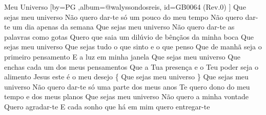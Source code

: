 \beginsong
{Meu Universo %
}[by={PG %
},album={@walyssondosreis},
id={GB0064 %
(Rev.0) %
}]
\beginverse*
Que sejas meu universo
Não quero dar-te só um pouco do meu tempo
Não quero dar-te um dia apenas da semana
\endverse
\beginverse*
Que sejas meu universo
Não quero dar-te as palavras como gotas
Quero que saia um dilúvio de bênçãos da minha boca
\endverse
\beginchorus
Que sejas meu universo
Que sejas tudo o que sinto e o que penso
Que de manhã seja o primeiro pensamento
E a luz em minha janela
Que sejas meu universo
Que enchas cada um dos meus pensamentos
Que a Tua presença e o Teu poder seja o alimento
Jesus este é o meu desejo
\{ Que sejas meu universo \}
\endchorus
\beginverse*
Que sejas meu universo
Não quero dar-te só uma parte dos meus anos
Te quero dono do meu tempo e dos meus planos
\endverse
\beginverse*
Que sejas meu universo
Não quero a minha vontade
Quero agradar-te
E cada sonho que há em mim quero entregar-te
\endverse
\begin{comment}
\lstset{basicstyle=\scriptsize\bf} %
\tab{Solo 1}
\begin{lstlisting}
E|-----------------------------------------------------|
B|-----------------------------------------------------|
G|-----------------------------------------------------|
D|-----------------------------------------------------|
A|-----------------------------------------------------|
E|-----------------------------------------------------|
\end{lstlisting}
\end{comment}
\vspace{2em} 
